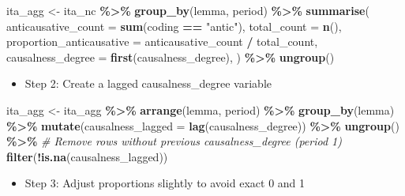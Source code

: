 \documentclass[
]{article}
\newenvironment{Shaded}{\begin{snugshade}}{\end{snugshade}}
\newcommand{\AttributeTok}[1]{\textcolor[rgb]{0.13,0.29,0.53}{#1}}
\newcommand{\CommentTok}[1]{\textcolor[rgb]{0.56,0.35,0.01}{\textit{#1}}}
\newcommand{\FunctionTok}[1]{\textcolor[rgb]{0.13,0.29,0.53}{\textbf{#1}}}
\newcommand{\NormalTok}[1]{#1}
\newcommand{\OtherTok}[1]{\textcolor[rgb]{0.56,0.35,0.01}{#1}}
\newcommand{\SpecialCharTok}[1]{\textcolor[rgb]{0.81,0.36,0.00}{\textbf{#1}}}
\newcommand{\StringTok}[1]{\textcolor[rgb]{0.31,0.60,0.02}{#1}}
\providecommand{\tightlist}{%
  \setlength{\itemsep}{0pt}\setlength{\parskip}{0pt}}
\begin{document}
\begin{Shaded}
\begin{Highlighting}[]
\NormalTok{ita\_agg }\OtherTok{\textless{}{-}}\NormalTok{ ita\_nc }\SpecialCharTok{\%\textgreater{}\%}
  \FunctionTok{group\_by}\NormalTok{(lemma, period) }\SpecialCharTok{\%\textgreater{}\%}
  \FunctionTok{summarise}\NormalTok{(}
    \AttributeTok{anticausative\_count =} \FunctionTok{sum}\NormalTok{(coding }\SpecialCharTok{==} \StringTok{"antic"}\NormalTok{),}
    \AttributeTok{total\_count =} \FunctionTok{n}\NormalTok{(),}
    \AttributeTok{proportion\_anticausative =}\NormalTok{ anticausative\_count }\SpecialCharTok{/}\NormalTok{ total\_count,}
    \AttributeTok{causalness\_degree =} \FunctionTok{first}\NormalTok{(causalness\_degree),}
\NormalTok{      ) }\SpecialCharTok{\%\textgreater{}\%}
  \FunctionTok{ungroup}\NormalTok{()}
\end{Highlighting}
\end{Shaded}

\begin{itemize}
\tightlist
\item
  Step 2: Create a lagged causalness\_degree variable
\end{itemize}

\begin{Shaded}
\begin{Highlighting}[]
\NormalTok{ita\_agg }\OtherTok{\textless{}{-}}\NormalTok{ ita\_agg }\SpecialCharTok{\%\textgreater{}\%}
  \FunctionTok{arrange}\NormalTok{(lemma, period) }\SpecialCharTok{\%\textgreater{}\%}
  \FunctionTok{group\_by}\NormalTok{(lemma) }\SpecialCharTok{\%\textgreater{}\%}
  \FunctionTok{mutate}\NormalTok{(}\AttributeTok{causalness\_lagged =} \FunctionTok{lag}\NormalTok{(causalness\_degree)) }\SpecialCharTok{\%\textgreater{}\%}
  \FunctionTok{ungroup}\NormalTok{() }\SpecialCharTok{\%\textgreater{}\%}
  \CommentTok{\# Remove rows without previous causalness\_degree (period 1)}
  \FunctionTok{filter}\NormalTok{(}\SpecialCharTok{!}\FunctionTok{is.na}\NormalTok{(causalness\_lagged))}
\end{Highlighting}
\end{Shaded}

\begin{itemize}
\tightlist
\item
  Step 3: Adjust proportions slightly to avoid exact 0 and 1
\end{itemize}
\end{document}
